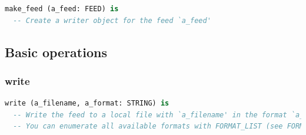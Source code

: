 \begin{lstlisting}[language=Eiffel]
make_feed (a_feed: FEED) is
  -- Create a writer object for the feed `a_feed'
\end{lstlisting}


\subsection{Basic operations}
\label{sec:feed-writer-basic-operations}

\subsubsection{write}

\begin{lstlisting}[language=Eiffel]
write (a_filename, a_format: STRING) is
  -- Write the feed to a local file with `a_filename' in the format `a_format'
  -- You can enumerate all available formats with FORMAT_LIST (see FORMATS)
\end{lstlisting}